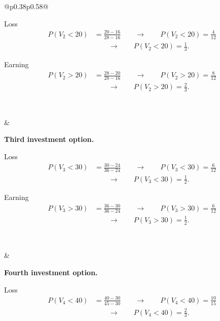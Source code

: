 \begin{center}
\begin{tabular}{@{}p{0.38\textwidth}p{0.58\textwidth}@{}}
\begin{minipage}[c]{\linewidth}
			Loss
			\[
			\begin{aligned}
				P(V_2<20)&=\frac{20-16}{28-16}
				\qquad \longrightarrow \qquad
				P(V_2<20)=\frac{4}{12}\\
				&\qquad \longrightarrow \qquad
				P(V_2<20)=\frac13.
			\end{aligned}
			\]
			
			Earning
			\[
			\begin{aligned}
				P(V_2>20)&=\frac{28-20}{28-16}
				\qquad \longrightarrow \qquad
				P(V_2>20)=\frac{8}{12}\\
				&\qquad \longrightarrow \qquad
				P(V_2>20)=\frac23.
			\end{aligned}
			\]
		\end{minipage}
		\\[0.4em]
		
		\begin{minipage}[c]{\linewidth}
			\centering
		\end{minipage}
		&
		\begin{minipage}[c]{\linewidth}
			\textbf{Third investment option.}
			
			Loss
			\[
			\begin{aligned}
				P(V_3<30)&=\frac{30-24}{36-24}
				\qquad \longrightarrow \qquad
				P(V_3<30)=\frac{6}{12}\\
				&\qquad \longrightarrow \qquad
				P(V_3<30)=\frac12.
			\end{aligned}
			\]
			
			Earning
			\[
			\begin{aligned}
				P(V_3>30)&=\frac{36-30}{36-24}
				\qquad \longrightarrow \qquad
				P(V_3>30)=\frac{6}{12}\\
				&\qquad \longrightarrow \qquad
				P(V_3>30)=\frac12.
			\end{aligned}
			\]
		\end{minipage}
		\\[0.4em]
		
		\begin{minipage}[c]{\linewidth}
			\centering
		\end{minipage}
		&
		\begin{minipage}[c]{\linewidth}
			\textbf{Fourth investment option.}
			
			Loss
			\[
			\begin{aligned}
				P(V_4<40)&=\frac{40-30}{45-30}
				\qquad \longrightarrow \qquad
				P(V_4<40)=\frac{10}{15}\\
				&\qquad \longrightarrow \qquad
				P(V_4<40)=\frac23.
			\end{aligned}
			\]
			

\end{minipage}
\end{tabular}
\end{center}
